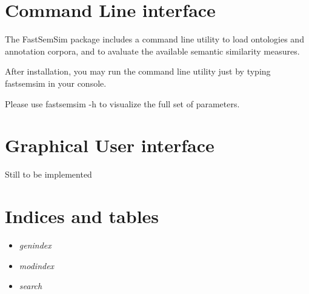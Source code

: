 \documentclass[letterpaper,10pt,english]{sphinxmanual}
\begin{document}
\begin{fulllineitems}
\begin{fulllineitems}
\label{fastsemsim.SemSim:fastsemsim.SemSim.SemSimUtils.SemSimUtils.int_det_p_table}
\end{fulllineitems}


\begin{fulllineitems}
\label{fastsemsim.SemSim:fastsemsim.SemSim.SemSimUtils.SemSimUtils.int_merge_sets}
\end{fulllineitems}


\begin{fulllineitems}
\label{fastsemsim.SemSim:fastsemsim.SemSim.SemSimUtils.SemSimUtils.intersection}
\end{fulllineitems}


\end{fulllineitems}



\chapter{Command Line interface}
\label{fastsemsim:command-line-interface}\label{fastsemsim:module-fastsemsim.fastsemsim_cmdline}
The FastSemSim package includes a command line utility to load ontologies and annotation corpora, and to avaluate the available semantic similarity measures.

After installation, you may run the command line utility just by typing fastsemsim in your console.

Please use fastsemsim -h to visualize the full set of parameters.


\chapter{Graphical User interface}
\label{fastsemsim:graphical-user-interface}
Still to be implemented


\chapter{Indices and tables}
\label{index:indices-and-tables}\begin{itemize}
\item {} 
\emph{genindex}

\item {} 
\emph{modindex}

\item {} 
\emph{search}

\end{itemize}
\end{document}
